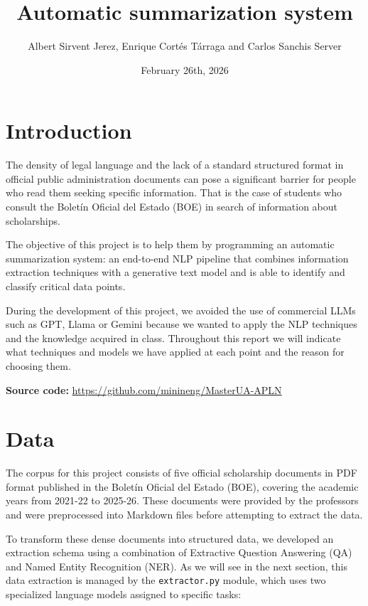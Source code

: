 \documentclass{article}
\title{Automatic summarization system}
\author{Albert Sirvent Jerez, Enrique Cortés Tárraga and Carlos Sanchis Server}
\date{February 26th, 2026}
\begin{document}
\sloppy

\maketitle

\newpage

\tableofcontents
\newpage

\section{Introduction}

The density of legal language and the lack of a standard structured format in official public administration documents can pose a significant barrier for people who read them seeking specific information. That is the case of students who consult the Boletín Oficial del Estado (BOE) in search of information about scholarships.

The objective of this project is to help them by programming an automatic summarization system: an end-to-end NLP pipeline that combines information extraction techniques with a generative text model and is able to identify and classify critical data points.

During the development of this project, we avoided the use of commercial LLMs such as GPT, Llama or Gemini because we wanted to apply the NLP techniques and the knowledge acquired in class. Throughout this report we will indicate what techniques and models we have applied at each point and the reason for choosing them.

\noindent \textbf{Source code:} \url{https://github.com/minineng/MasterUA-APLN}

\section{Data}

The corpus for this project consists of five official scholarship documents in PDF format published in the Boletín Oficial del Estado (BOE), covering the academic years from 2021-22 to 2025-26. These documents were provided by the professors and were preprocessed into Markdown files before attempting to extract the data.

To transform these dense documents into structured data, we developed an extraction schema using a combination of Extractive Question Answering (QA) and Named Entity Recognition (NER). As we will see in the next section, this data extraction is managed by the \texttt{extractor.py} module, which uses two specialized language models assigned to specific tasks:
\end{document}
